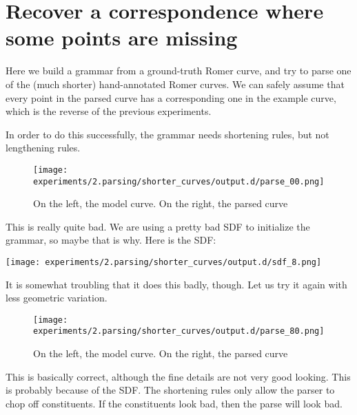 
\FloatBarrier

\section{Recover a correspondence where some points are missing}

Here we build a grammar from a ground-truth Romer curve, and try to
parse one of the (much shorter) hand-annotated Romer curves. We can
safely assume that every point in the parsed curve has a corresponding
one in the example curve, which is the reverse of the previous
experiments.

In order to do this successfully, the grammar needs shortening rules,
but not lengthening rules.

\begin{figure}
\texttt{[image: experiments/2.parsing/shorter\_curves/output.d/parse\_00.png]}
\caption{On the left, the model curve. On the right, the parsed curve}
\end{figure}

This is really quite bad. We are using a pretty bad SDF to initialize
the grammar, so maybe that is why. Here is the SDF:

\texttt{[image: experiments/2.parsing/shorter\_curves/output.d/sdf\_8.png]}

It is somewhat troubling that it does this badly, though. Let us try
it again with less geometric variation.

\begin{figure}
\caption{On the left, the model curve. On the right, the parsed curve}
\texttt{[image: experiments/2.parsing/shorter\_curves/output.d/parse\_80.png]}
\end{figure}

This is basically correct, although the fine details are not very good
looking. This is probably because of the SDF. The shortening rules
only allow the parser to chop off constituents. If the constituents
look bad, then the parse will look bad.

